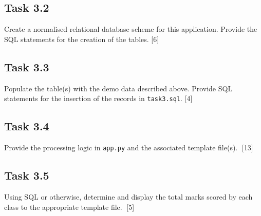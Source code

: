 \subsection*{Task 3.2 }

Create a normalised relational database scheme for this application.
Provide the SQL statements for the creation of the tables. \hfill{}{[}6{]}

\subsection*{Task 3.3 }

Populate the table(s) with the demo data described above. Provide
SQL statements for the insertion of the records in \texttt{task3.sql}.\hfill{}
{[}4{]}

\subsection*{Task 3.4 }

Provide the processing logic in \texttt{app.py} and the associated
template file(s). \textcolor{white}{.}\hfill{}{[}13{]}

\subsection*{Task 3.5 }

Using SQL or otherwise, determine and display the total marks scored
by each class to the appropriate template file. \textcolor{white}{.}\hfill{}{[}5{]}